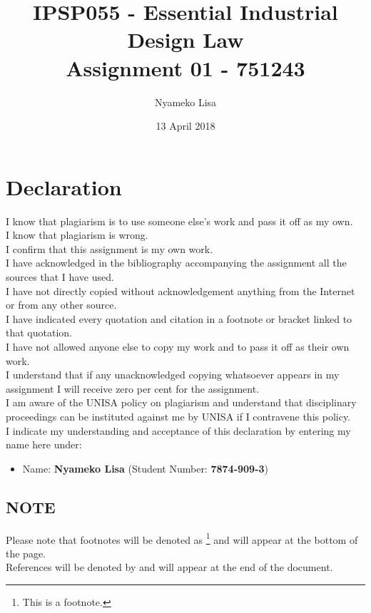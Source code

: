 \documentclass[11pt]{article}
\author{Nyameko Lisa}
\date{13 April 2018}
\title{IPSP055 - Essential Industrial Design Law\\\medskip
\large Assignment 01 - 751243}
\begin{document}
\maketitle
\addvspace{110pt}

\justifying
\addvspace{110pt}
\section*{Declaration}
\label{sec:org8ee5f2a}
I know that plagiarism is to use someone else’s work and pass it off as my own.\\
I know that plagiarism is wrong.\\
I confirm that this assignment is my own work.\\
I have acknowledged in the bibliography accompanying the assignment all the sources that I have used.\\
I have not directly copied without acknowledgement anything from the Internet or from any other source.\\
I have indicated every quotation and citation in a footnote or bracket linked to that quotation.\\
I have not allowed anyone else to copy my work and to pass it off as their own work.\\
I understand that if any unacknowledged copying whatsoever appears in my assignment I will receive zero per cent for the assignment.\\
I am aware of the UNISA policy on plagiarism and understand that disciplinary proceedings can be instituted against me by UNISA if I contravene this policy.\\
I indicate my understanding and acceptance of this declaration by
entering my name here under:
\begin{itemize}
\item Name: \textbf{Nyameko Lisa} (Student Number: \textbf{7874-909-3})
\end{itemize}

\subsection*{NOTE}
\label{sec:org9ccdf57}
Please note that footnotes will be denoted as \footnote{This is a footnote.} and will
appear at the bottom of the page.\\
References will be denoted by \cite{rsa93_designs_act} and will appear at the end of the document.
\newpage
\end{document}
